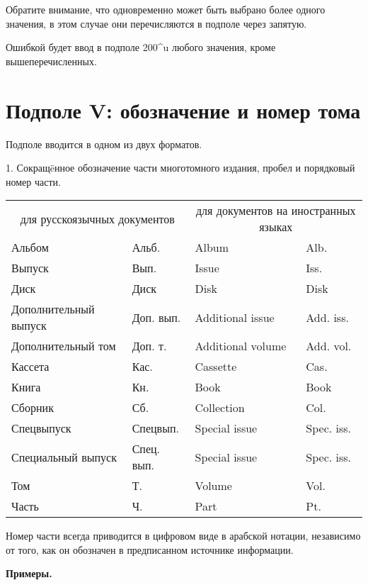 Обратите внимание, что одновременно может быть выбрано более одного значения, в этом случае они перечисляются в подполе через запятую.

Ошибкой будет ввод в подполе 200\^{}u любого значения, кроме вышеперечисленных.

\section{Подполе V: обозначение и номер тома}

Подполе вводится в одном из двух форматов.

1. Сокращ\"eнное обозначение части многотомного издания, пробел и порядковый номер части.

{\noindent\scriptsize\begin{tabular}{|l|l|l|l|}
	\hline 
	\thead{Обозначение части} & \thead{Сокращение}  & \thead{Обозначение части}  & \thead{Сокращение}  \\ 
	\hline 
	\multicolumn{2}{|c|}{для русскоязычных документов} &  \multicolumn{2}{|c|}{для документов на иностранных языках}  \\ 
	\hline 
	Альбом & Альб. & Album & Alb.  \\ 
	\hline 
	Выпуск &  Вып. &  Issue & Iss.  \\ 
	\hline 
	Диск &  Диск &  Disk & Disk  \\ 
	\hline 
	Дополнительный выпуск &  Доп. вып. & Additional issue & Add. iss.  \\ 
	\hline 
	Дополнительный том &  Доп. т. &  Additional volume & Add. vol.  \\ 
	\hline 
	Кассета & Кас. &  Cassette & Cas. \\ 
	\hline 
	Книга & Кн. & Book & Book \\ 
	\hline 
	Сборник &  Сб. & Collection & Col.  \\ 
	\hline 
	Спецвыпуск & Спецвып. & Special issue & Spec. iss. \\ 
	\hline 
	Специальный выпуск &  Спец. вып. & Special issue & Spec. iss. \\ 
	\hline 
	Том &  Т. & Volume & Vol. \\ 
	\hline 
	Часть &  Ч. & Part  & Pt.  \\ 
	\hline 
\end{tabular} 
}

Номер части всегда приводится в цифровом виде в арабской нотации, независимо от того, как он обозначен в предписанном источнике информации.

\textbf{Примеры.}

